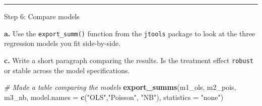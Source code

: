 \documentclass[
]{article}
\newenvironment{Shaded}{\begin{snugshade}}{\end{snugshade}}
\newcommand{\AttributeTok}[1]{\textcolor[rgb]{0.13,0.29,0.53}{#1}}
\newcommand{\CommentTok}[1]{\textcolor[rgb]{0.56,0.35,0.01}{\textit{#1}}}
\newcommand{\FunctionTok}[1]{\textcolor[rgb]{0.13,0.29,0.53}{\textbf{#1}}}
\newcommand{\NormalTok}[1]{#1}
\newcommand{\StringTok}[1]{\textcolor[rgb]{0.31,0.60,0.02}{#1}}
\begin{document}
\begin{center}\rule{0.5\linewidth}{0.5pt}\end{center}

Step 6: Compare models

\textbf{a.} Use the \texttt{export\_summ()} function from the
\texttt{jtools} package to look at the three regression models you fit
side-by-side.

\textbf{c.} Write a short paragraph comparing the results. Is the
treatment effect \texttt{robust} or stable across the model
specifications.

\begin{Shaded}
\begin{Highlighting}[]
\CommentTok{\# Made a table comparing the models}
\FunctionTok{export\_summs}\NormalTok{(m1\_ols, m2\_pois, m3\_nb,}
             \AttributeTok{model.names =} \FunctionTok{c}\NormalTok{(}\StringTok{"OLS"}\NormalTok{,}\StringTok{"Poisson"}\NormalTok{, }\StringTok{"NB"}\NormalTok{),}
             \AttributeTok{statistics =} \StringTok{"none"}\NormalTok{)}
\end{Highlighting}
\end{Shaded}

 
  \providecommand{\huxb}[2]{\arrayrulecolor[RGB]{#1}\global\arrayrulewidth=#2pt}
  \providecommand{\huxvb}[2]{\color[RGB]{#1}\vrule width #2pt}
  \providecommand{\huxtpad}[1]{\rule{0pt}{#1}}
  \providecommand{\huxbpad}[1]{\rule[-#1]{0pt}{#1}}
\end{document}
